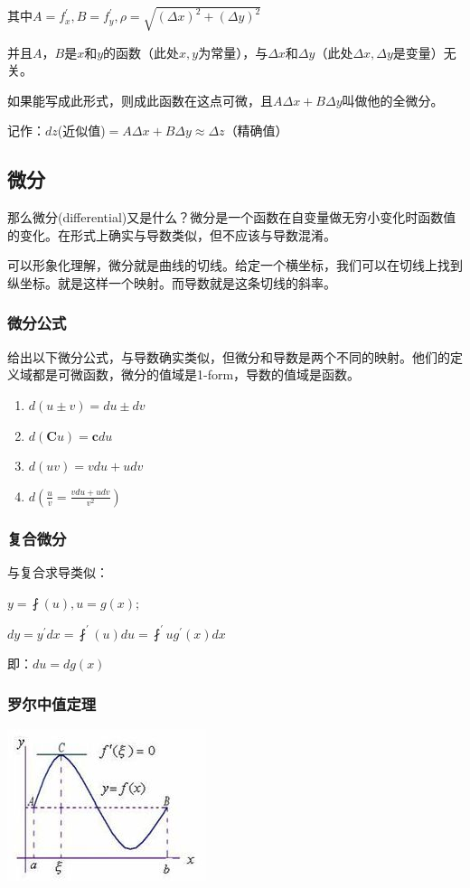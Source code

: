 \documentclass[UTF8]{ctexbook}
\newcommand{\derivative}{^\prime}
\newcommand{\partialDerivative}[1]{^\prime_{#1}}
\begin{document}
{{{{    其中$A = f\partialDerivative{x}, B = f\partialDerivative{y}, \rho = \sqrt{(\Delta x)^2 + (\Delta y)^2}$

    并且$A，B$是$x$和$y$的函数（此处$x,y$为常量），与$\Delta x$和$\Delta y$（此处$\Delta x, \Delta y$是变量）无关。

    如果能写成此形式，则成此函数在这点可微，且$A\Delta x + B\Delta y$叫做他的全微分。

    记作：$dz$(近似值)$= A\Delta x + B\Delta y \approx \Delta z$（精确值）

  }

}%

\subsection{微分}{
那么微分(differential)又是什么？微分是一个函数在自变量做无穷小变化时函数值的变化。在形式上确实与导数类似，但不应该与导数混淆。

可以形象化理解，微分就是曲线的切线。给定一个横坐标，我们可以在切线上找到纵坐标。就是这样一个映射。而导数就是这条切线的斜率。

\subsubsection{微分公式}{
  给出以下微分公式，与导数确实类似，但微分和导数是两个不同的映射。他们的定义域都是可微函数，微分的值域是1-form，导数的值域是函数。
  \begin{enumerate}
    \item $d(u \pm v) = du \pm dv$
    \item $d(\mathbf{C}u) = \mathbf{c}du$
    \item $d(uv) = vdu + udv$
    \item $d(\frac{u}{v} = \frac{vdu + udv}{v^2})$
  \end{enumerate}
}%

\subsubsection{复合微分}{
  与复合求导类似：

  $y = \fint(u), u = g(x);$

  $dy = y\derivative dx = \fint\derivative(u)du = \fint\derivative{u}g\derivative(x)dx$

  即：$du = dg(x)$
}%

\subsubsection{罗尔中值定理}{
  \includegraphics{resources/Rolle's_mean_value_theorem.jpg}

}}}}
\end{document}
